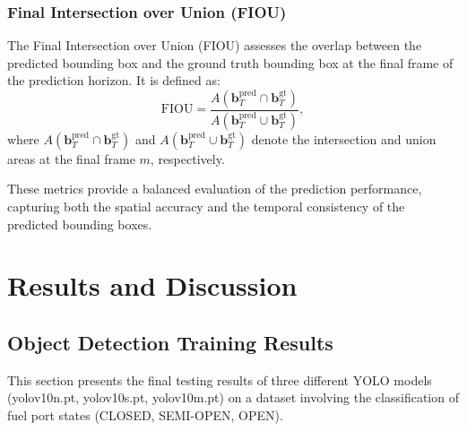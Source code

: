 \documentclass[12pt,oneside]{book} %
\begin{document}
\subsection*{Final Intersection over Union (FIOU)}
The Final Intersection over Union (FIOU) assesses the overlap between the
predicted bounding box and the ground truth bounding box at the final frame of
the prediction horizon. It is defined as:
\begin{equation}
    \text{FIOU} = \frac{A(\mathbf{b}_T^{\text{pred}} \cap \mathbf{b}_T^{\text{gt}})}{A(\mathbf{b}_T^{\text{pred}} \cup \mathbf{b}_T^{\text{gt}})},
\end{equation}
where \(A(\mathbf{b}_T^{\text{pred}} \cap \mathbf{b}_T^{\text{gt}})\) and \(A(\mathbf{b}_T^{\text{pred}} \cup \mathbf{b}_T^{\text{gt}})\) denote the intersection and union areas at the final frame \(m\), respectively.

These metrics provide a balanced evaluation of the prediction performance,
capturing both the spatial accuracy and the temporal consistency of the
predicted bounding boxes.

\chapter{Results and Discussion}\label{chap:results}

\section{Object Detection Training Results}

This section presents the final testing results of three different YOLO models
(yolov10n.pt, yolov10s.pt, yolov10m.pt) on a dataset involving the
classification of fuel port states (CLOSED, SEMI-OPEN, OPEN).
\end{document}
